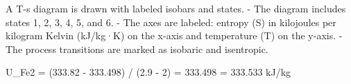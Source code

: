 A T-s diagram is drawn with labeled isobars and states.  
- The diagram includes states 1, 2, 3, 4, 5, and 6.  
- The axes are labeled: entropy (S) in kilojoules per kilogram Kelvin (kJ/kg·K) on the x-axis and temperature (T) on the y-axis.  
- The process transitions are marked as isobaric and isentropic.

U_Fe2 = (333.82 - 333.498) / (2.9 - 2)  
= 333.498 = 333.533 kJ/kg